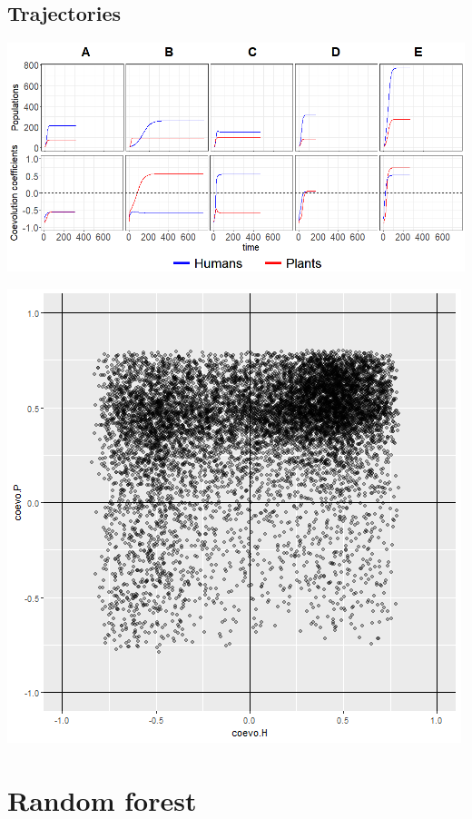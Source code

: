 \documentclass[
]{book}
\begin{document}
\hypertarget{trajectories}{%
\subsection{Trajectories}\label{trajectories}}

\includegraphics[width=1\linewidth]{plots/5_multiplePar-pop_trajectories-ggplot}

\newpage

\includegraphics[width=1\linewidth]{plots/5_multiplePar-coevo_endstates-ggplot}

\newpage

\hypertarget{random-forest}{%
\section{Random forest}\label{random-forest}}
\end{document}
